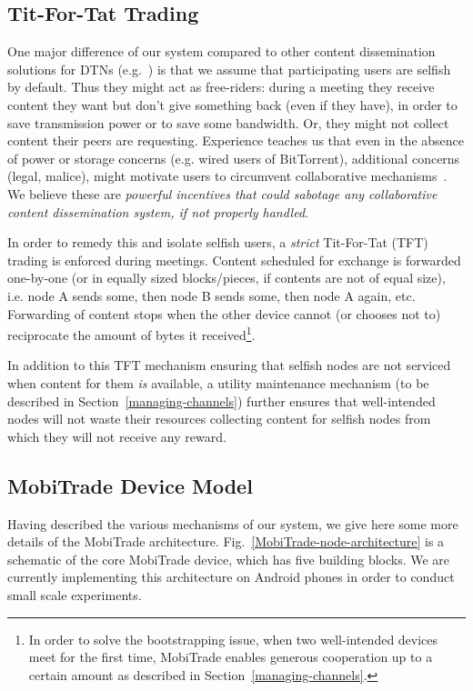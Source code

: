 \subsection{Tit-For-Tat Trading}
\label{contents-trading-scheduling}

One major difference of our system compared to other content dissemination solutions for DTNs (e.g.~\cite{May07wirelessopportunistic,ContentPlace,TACODTN}) is that we assume that participating users are selfish by default. Thus they might act as free-riders: during a meeting they receive content they want but don't give something back (even if they have), in order to save transmission power or to save some bandwidth. Or, they might not collect content their peers are requesting. Experience teaches us that even in the absence of power or storage concerns (e.g. wired users of BitTorrent), additional concerns (legal, malice), might motivate users to circumvent collaborative mechanisms~\cite{BitThief}. We believe these are \emph{powerful incentives that could sabotage any collaborative content dissemination system, if not properly handled}.

In order to remedy this and isolate selfish users, a \emph{strict} Tit-For-Tat (TFT) trading is enforced during meetings. Content scheduled for exchange is forwarded one-by-one (or in equally sized blocks/pieces, if contents are not of equal size), i.e. node A sends some, then node B sends some, then node A again, etc. Forwarding of content stops when the other device cannot (or chooses not to) reciprocate the amount of bytes it received\footnote{In order to solve the bootstrapping issue, when two well-intended devices meet for the first time, MobiTrade enables generous cooperation up to a certain amount as described in Section~\ref{managing-channels}.}. 

In addition to this TFT mechanism ensuring that selfish nodes are not serviced when content for them \emph{is} available, a utility maintenance mechanism (to be described in Section~\ref{managing-channels}) further ensures that well-intended nodes will not waste their resources collecting content for selfish nodes from which they will not receive any reward.

\subsection{MobiTrade Device Model}
\label{MobiTrade-node}

Having described the various mechanisms of our system, we give here some more details of the MobiTrade architecture. Fig.~\ref{MobiTrade-node-architecture} is a schematic of the core MobiTrade device, which has five building blocks. We are currently implementing this architecture on Android phones in order to conduct small scale experiments.

